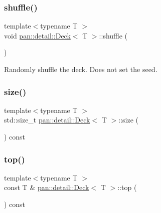 \mbox{\label{classpan_1_1detail_1_1_deck_af6f9182fc5bb8c77f50ebd9a3a3a3606}} 
\subsubsection{\texorpdfstring{shuffle()}{shuffle()}}
{\footnotesize\ttfamily template$<$typename T $>$ \\
void \hyperlink{classpan_1_1detail_1_1_deck}{pan\+::detail\+::\+Deck}$<$ T $>$\+::shuffle (\begin{DoxyParamCaption}{ }\end{DoxyParamCaption})\hspace{0.3cm}{\ttfamily [inline]}}

Randomly shuffle the deck. Does not set the seed. \mbox{\label{classpan_1_1detail_1_1_deck_a4ccde71b3fae9ce2ea3da99ad500c9ba}} 
\subsubsection{\texorpdfstring{size()}{size()}}
{\footnotesize\ttfamily template$<$typename T $>$ \\
std\+::size\+\_\+t \hyperlink{classpan_1_1detail_1_1_deck}{pan\+::detail\+::\+Deck}$<$ T $>$\+::size (\begin{DoxyParamCaption}{ }\end{DoxyParamCaption}) const\hspace{0.3cm}{\ttfamily [inline]}}

\mbox{\label{classpan_1_1detail_1_1_deck_a12ce80897ff102e94279a81584b29e2d}} 
\subsubsection{\texorpdfstring{top()}{top()}}
{\footnotesize\ttfamily template$<$typename T $>$ \\
const T \& \hyperlink{classpan_1_1detail_1_1_deck}{pan\+::detail\+::\+Deck}$<$ T $>$\+::top (\begin{DoxyParamCaption}{ }\end{DoxyParamCaption}) const\hspace{0.3cm}{\ttfamily [inline]}}



